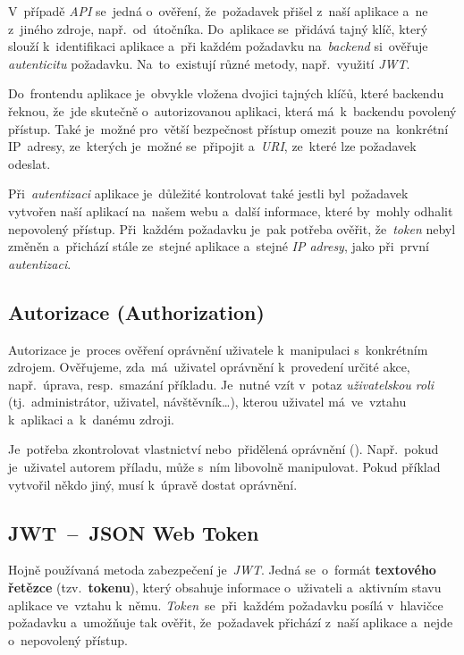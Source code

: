 \documentclass[11pt,a4paper]{report}
\begin{document}
                V~případě \emph{API} se~jedná o~ověření, že~požadavek přišel z~naší aplikace a~ne z~jiného zdroje, např.~od~útočníka. Do~aplikace se~přidává tajný klíč, který slouží k~identifikaci aplikace a~při každém požadavku na~\emph{backend} si~ověřuje \emph{autenticitu} požadavku. Na~to~existují různé metody, např.~využití \emph{JWT}.
                
                Do~frontendu aplikace je~obvykle vložena dvojici tajných klíčů, které backendu řeknou, že~jde skutečně o~autorizovanou aplikaci, která má~k~backendu povolený přístup. Také je~možné pro~větší bezpečnost přístup omezit pouze na~konkrétní IP~adresy, ze~kterých je~možné se~připojit a~\emph{URI}, ze~které lze požadavek odeslat.

                Při~\emph{autentizaci} aplikace je~důležité kontrolovat také jestli byl~požadavek vytvořen naší aplikací na~našem webu a~další informace, které by~mohly odhalit nepovolený přístup. Při~každém požadavku je~pak potřeba ověřit, že~\emph{token} nebyl změněn a~přichází stále ze~stejné aplikace a~stejné \emph{IP adresy}, jako při~první \emph{autentizaci}. \cite{graham2021ethical}
            
            \subsection{Autorizace (Authorization)}
                Autorizace je~proces ověření oprávnění uživatele k~manipulaci s~konkrétním zdrojem. Ověřujeme, zda~má~uživatel oprávnění k~provedení určité akce, např.~úprava, resp.~smazání příkladu. Je~nutné vzít v~potaz \emph{uživatelskou roli} (tj.~administrátor, uživatel, návštěvník\dots), kterou uživatel má~ve~vztahu k~aplikaci a~k~danému zdroji.
                
                Je~potřeba zkontrolovat vlastnictví nebo~přidělená oprávnění (). Např.~pokud je~uživatel autorem příladu, může s~ním libovolně manipulovat. Pokud příklad vytvořil někdo jiný, musí k~úpravě dostat oprávnění. \cite{graham2021ethical}

            \subsection{JWT~--~JSON Web Token}
                Hojně používaná metoda zabezpečení je~\emph{JWT}. Jedná se~o~formát \textbf{textového řetězce} (tzv.~\textbf{tokenu}), který obsahuje informace o~uživateli a~aktivním stavu aplikace ve~vztahu k~němu. \emph{Token}~se~při~každém požadavku posílá v~hlavičce požadavku a~umožňuje tak ověřit, že~požadavek přichází z~naší aplikace a~nejde o~nepovolený přístup.
                
\end{document}
